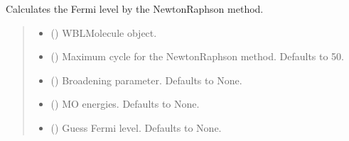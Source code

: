 \documentclass[letterpaper,10pt,english]{sphinxmanual}
\begin{document}
\begin{fulllineitems}
\label{\detokenize{fcdft.wbl:fcdft.wbl.rks.get_fermi_level}}
\pysigstartsignatures
\pysiglinewithargsret
{}
{\sphinxparamcomma {}\sphinxparamcomma {}\sphinxparamcomma {}\sphinxparamcomma {}\sphinxparamcomma {}\sphinxparamcomma {}}
{}
\pysigstopsignatures
\sphinxAtStartPar
Calculates the Fermi level by the Newton\sphinxhyphen{}Raphson method.
\begin{quote}\begin{description}
\begin{itemize}
\item {} 
\sphinxAtStartPar
{} () \textendash{} WBLMolecule object.

\item {} 
\sphinxAtStartPar
{} (\sphinxstyleliteralemphasis{\sphinxupquote{, }}) \textendash{} Maximum cycle for the Newton\sphinxhyphen{}Raphson method. Defaults to 50.

\item {} 
\sphinxAtStartPar
{} (\sphinxstyleliteralemphasis{\sphinxupquote{, }}) \textendash{} Broadening parameter. Defaults to None.

\item {} 
\sphinxAtStartPar
{} (\sphinxstyleliteralemphasis{\sphinxupquote{, }}) \textendash{} MO energies. Defaults to None.

\item {} 
\sphinxAtStartPar
{} (\sphinxstyleliteralemphasis{\sphinxupquote{, }}) \textendash{} Guess Fermi level. Defaults to None.


\end{itemize}
\end{description}
\end{quote}
\end{fulllineitems}
\end{document}
